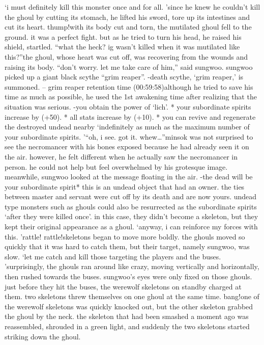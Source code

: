 ‘i must definitely kill this monster once and for all.
’since he knew he couldn’t kill the ghoul by cutting its stomach, he lifted his sword, tore up its intestines and cut its heart.
thump!with its body cut and torn, the mutilated ghoul fell to the ground.
it was a perfect fight.
 but as he tried to turn his head, he raised his shield, startled.
“what the heck? ig wasn’t killed when it was mutilated like this?”the ghoul, whose heart was cut off, was recovering from the wounds and raising its body.
“don’t worry.
 let me take care of him,” said sungwoo.
sungwoo picked up a giant black scythe “grim reaper”.
-death scythe, ‘grim reaper,’ is summoned.
– grim reaper retention time (00:59:58)although he tried to save his time as much as possible, he used the 1st awakening time after realizing that the situation was serious.
-you obtain the power of ‘lich’.
* your subordinate spirits increase by (+50).
* all stats increase by (+10).
* you can revive and regenerate the destroyed undead nearby ‘indefinitely as much as the maximum number of your subordinate spirits.
’“oh, i see.
 got it.
 whew…”minsok was not surprised to see the necromancer with his bones exposed because he had already seen it on the air.
however, he felt different when he actually saw the necromancer in person.
 he could not help but feel overwhelmed by his grotesque image.
meanwhile, sungwoo looked at the message floating in the air.
-the dead will be your subordinate spirit* this is an undead object that had an owner.
 the ties between master and servant were cut off by its death and are now yours.
undead type monsters such as ghouls could also be resurrected as the subordinate spirits ‘after they were killed once’.
 in this case, they didn’t become a skeleton, but they kept their original appearance as a ghoul.
‘anyway, i can reinforce my forces with this.
’rattle! rattle!skeletons began to move more boldly.
 the ghouls moved so quickly that it was hard to catch them, but their target, namely sungwoo, was slow.
‘let me catch and kill those targeting the players and the buses.
’surprisingly, the ghouls ran around like crazy, moving vertically and horizontally, then rushed towards the buses.
sungwoo’s eyes were only fixed on those ghouls.
 just before they hit the buses, the werewolf skeletons on standby charged at them.
 two skeletons threw themselves on one ghoul at the same time.
bang!one of the werewolf skeletons was quickly knocked out, but the other skeleton grabbed the ghoul by the neck.
 the skeleton that had been smashed a moment ago was reassembled, shrouded in a green light, and suddenly the two skeletons started striking down the ghoul.
